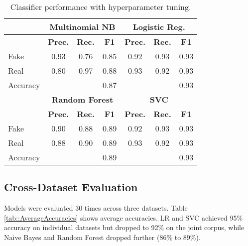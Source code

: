 \documentclass[conference]{IEEEtran}
\begin{document}
\begin{table}[!t]
\caption{Classifier performance with hyperparameter tuning.}
\label{tab:hyperparam_summary}
\begin{center}
\begin{tabular}{|l|ccc|ccc|}
\hline
& \multicolumn{3}{c|}{\textbf{Multinomial NB}} & \multicolumn{3}{c|}{\textbf{Logistic Reg.}} \\
\hline
& \textbf{Prec.} & \textbf{Rec.} & \textbf{F1} & \textbf{Prec.} & \textbf{Rec.} & \textbf{F1} \\
\hline
Fake & 0.93 & 0.76 & 0.85 & 0.92 & 0.93 & 0.93 \\
Real & 0.80 & 0.97 & 0.88 & 0.93 & 0.92 & 0.93 \\
Accuracy & & & 0.87 & & & 0.93 \\
\hline
& \multicolumn{3}{c|}{\textbf{Random Forest}} & \multicolumn{3}{c|}{\textbf{SVC}} \\
\hline
& \textbf{Prec.} & \textbf{Rec.} & \textbf{F1} & \textbf{Prec.} & \textbf{Rec.} & \textbf{F1} \\
\hline
Fake & 0.90 & 0.88 & 0.89 & 0.92 & 0.93 & 0.93 \\
Real & 0.88 & 0.90 & 0.89 & 0.93 & 0.92 & 0.93 \\
Accuracy & & & 0.89 & & & 0.93 \\
\hline
\end{tabular}
\end{center}
\end{table}

\subsection{Cross-Dataset Evaluation}
Models were evaluated 30 times across three datasets. Table \ref{tab::AverageAccuracies} shows average accuracies. LR and SVC achieved 95\% accuracy on individual datasets but dropped to 92\% on the joint corpus, while Naive Bayes and Random Forest dropped further (86\% to 89\%).
\end{document}
